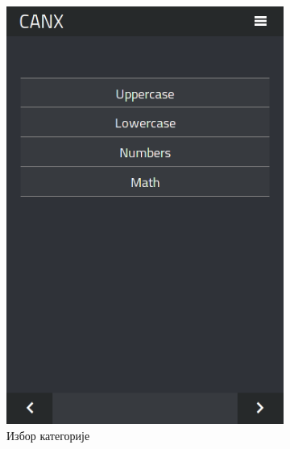 \documentclass[a4paper]{article}
\begin{document}
\begin{figure}
\centering
\begin{subfigure}{.5\textwidth}
  \centering
  \includegraphics[width=.9\linewidth]{categories}
  \caption{Избор категорије}
  \label{fig:sub1}
\end{subfigure}%
\begin{subfigure}{.5\textwidth}
  \centering

\end{subfigure}
\end{figure}
\end{document}

